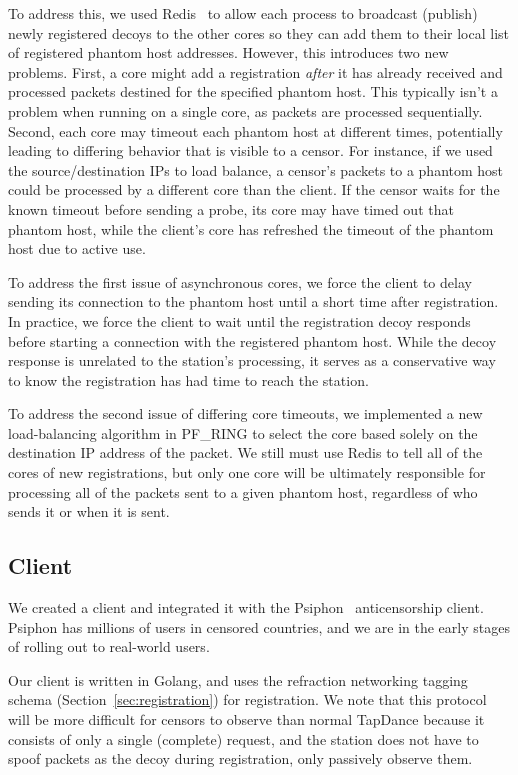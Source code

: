 \documentclass[sigconf]{acmart}
\begin{document}
To address this, we used Redis~\cite{redis} to allow each process to broadcast
(publish) newly registered decoys to the other cores so they can
add them to their local list of registered phantom host addresses.
However, this introduces two new problems. First, a core might add a
registration \emph{after} it has already received and processed packets destined
for the specified phantom host. This typically isn't a problem when running on a
single core, as packets are processed sequentially. Second, each core may
timeout each phantom host at different times, potentially leading to differing
behavior that is visible to a censor. For instance, if we used the
source/destination IPs to load balance, a censor's packets to a phantom host could
be processed by a different core than the client. If the censor waits for the
known timeout before sending a probe, its core may have timed out that phantom host, while the client's core has refreshed the timeout of the phantom host due
to active use.

To address the first issue of asynchronous cores, we force the client to delay sending its connection
to the phantom host until a short time after registration. In practice, we force
the client to wait until the registration decoy responds before starting a
connection with the registered phantom host. While the decoy response is
unrelated to the station's processing, it serves as a conservative way to know
the registration has had time to reach the station.

To address the second issue of differing core timeouts, we implemented a new
load-balancing algorithm in
PF\_RING to select the core based solely on the destination IP address of the
packet. We still must use Redis to tell all of the cores of new
registrations, but only one core will be ultimately responsible for processing all of
the packets sent to a given phantom host, regardless of who sends it or when it is sent.


\subsection{Client}


We created a \scheme client and integrated it with the Psiphon~\cite{psiphon}
anticensorship client. Psiphon has millions of users in censored countries, and
we are in the early stages of rolling \scheme out to real-world users.

Our \scheme client is written in Golang, and uses the refraction networking tagging
schema (Section~\ref{sec:registration}) for
registration. We note that this protocol will be more difficult for censors to observe
than normal TapDance because it consists of only a single (complete) request, and the station does
not have to spoof packets as the decoy during registration, only passively
observe them. 
\end{document}
